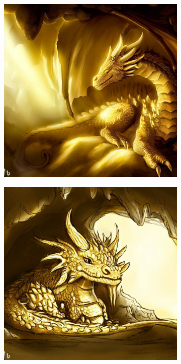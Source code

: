 \documentclass[11pt, twoside]{article}
\begin{document}
\begin{figure}[H]
\begin{subfigure}{0.3\textwidth}
    \includegraphics[width=0.99\linewidth]{drache2.jpeg}
  \end{subfigure}%
  \begin{subfigure}{0.3\textwidth}
    \centering
    \includegraphics[width=0.99\linewidth]{drache3.jpeg}
  \end{subfigure}
\end{figure}
\end{document}
